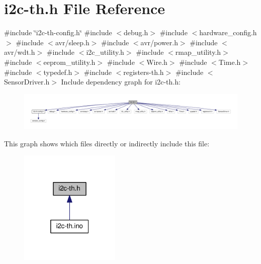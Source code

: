 \hypertarget{i2c-th_8h}{}\section{i2c-\/th.h File Reference}
\label{i2c-th_8h}
{\ttfamily \#include \char`\"{}i2c-\/th-\/config.\+h\char`\"{}}\newline
{\ttfamily \#include $<$debug.\+h$>$}\newline
{\ttfamily \#include $<$hardware\+\_\+config.\+h$>$}\newline
{\ttfamily \#include $<$avr/sleep.\+h$>$}\newline
{\ttfamily \#include $<$avr/power.\+h$>$}\newline
{\ttfamily \#include $<$avr/wdt.\+h$>$}\newline
{\ttfamily \#include $<$i2c\+\_\+utility.\+h$>$}\newline
{\ttfamily \#include $<$rmap\+\_\+utility.\+h$>$}\newline
{\ttfamily \#include $<$eeprom\+\_\+utility.\+h$>$}\newline
{\ttfamily \#include $<$Wire.\+h$>$}\newline
{\ttfamily \#include $<$Time.\+h$>$}\newline
{\ttfamily \#include $<$typedef.\+h$>$}\newline
{\ttfamily \#include $<$registers-\/th.\+h$>$}\newline
{\ttfamily \#include $<$Sensor\+Driver.\+h$>$}\newline
Include dependency graph for i2c-\/th.h\+:
\nopagebreak
\begin{figure}[H]
\begin{center}
\leavevmode
\includegraphics[width=350pt]{i2c-th_8h__incl}
\end{center}
\end{figure}
This graph shows which files directly or indirectly include this file\+:
\nopagebreak
\begin{figure}[H]
\begin{center}
\leavevmode
\includegraphics[width=136pt]{i2c-th_8h__dep__incl}
\end{center}
\end{figure}
